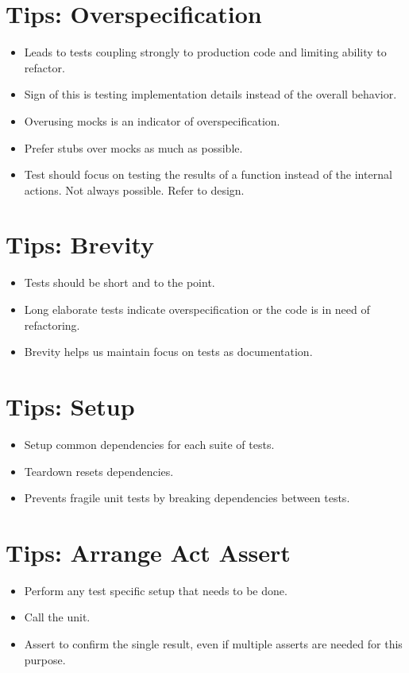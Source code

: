 \documentclass{article}
\begin{document}
\newpage
\section{Tips: Overspecification}
\begin{itemize}
    \item Leads to tests coupling strongly to production code and limiting
        ability to refactor.
    \item Sign of this is testing implementation details instead of the overall
        behavior.
    \item Overusing mocks is an indicator of overspecification.
    \item Prefer stubs over mocks as much as possible.
    \item Test should focus on testing the results of a function instead of the
        internal actions. Not always possible. Refer to design.
\end{itemize}

\newpage
\section{Tips: Brevity}
\begin{itemize}
    \item Tests should be short and to the point.
    \item Long elaborate tests indicate overspecification or the code is in
        need of refactoring.
    \item Brevity helps us maintain focus on tests as documentation.
\end{itemize}

\newpage
\section{Tips: Setup}
\begin{itemize}
    \item Setup common dependencies for each suite of tests.
    \item Teardown resets dependencies.
    \item Prevents fragile unit tests by breaking dependencies between tests.
\end{itemize}

\newpage
\section{Tips: Arrange Act Assert}
\begin{itemize}
    \item Perform any test specific setup that needs to be done.
    \item Call the unit.
    \item Assert to confirm the single result, even if multiple asserts are
        needed for this purpose.
\end{itemize}
\end{document}
